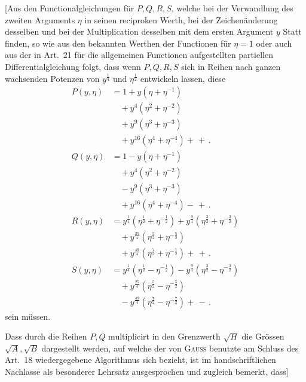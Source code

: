 [Aus den Functionalgleichungen für $P,\allowbreak Q,\allowbreak R,\allowbreak S$, welche bei der Verwandlung des zweiten Arguments $\eta$ in seinen reciproken Werth, bei der Zeichenänderung desselben und bei der Multiplication desselben mit dem ersten Argument $y$ Statt finden, so wie aus den bekannten Werthen der Functionen für $\eta=1$ oder auch aus der in Art.~21 für die allgemeinen Functionen aufgestellten partiellen Differentialgleichung folgt, dass wenn $P,\allowbreak Q,\allowbreak R,\allowbreak S$ sich in Reihen nach ganzen wachsenden Potenzen von $y^{\frac14}$ und $\eta^{\frac12}$ entwickeln lassen, diese
\[
\begin{aligned}
P(y,\eta)&=1+y(\eta+\eta^{-1})\\[4pt]&\quad{}+y^4(\eta^2+\eta^{-2})\\[4pt]&\quad{}+y^9(\eta^3+\eta^{-3})\\[4pt]&\quad{}+y^{16}(\eta^4+\eta^{-4})+\,+\,.\\[10pt]
Q(y,\eta)&=1-y(\eta+\eta^{-1})\\[4pt]&\quad{}+y^4(\eta^2+\eta^{-2})\\[4pt]&\quad{}-y^9(\eta^3+\eta^{-3})\\[4pt]&\quad{}+y^{16}(\eta^4+\eta^{-4})-\,+\,.\\[10pt]
R(y,\eta)&=y^{\frac14}(\eta^{\frac12}+\eta^{-\frac12})+y^{\frac94}(\eta^{\frac32}+\eta^{-\frac32})\\[4pt]&\quad{}+y^{\frac{25}4}(\eta^{\frac52}+\eta^{-\frac52})\\[4pt]&\quad{}+y^{\frac{49}4}(\eta^{\frac72}+\eta^{-\frac72})+\,+\,.\\[10pt]
S(y,\eta)&=y^{\frac14}(\eta^{\frac12}-\eta^{-\frac12})-y^{\frac94}(\eta^{\frac32}-\eta^{-\frac32})\\[4pt]&\quad{}+y^{\frac{25}4}(\eta^{\frac52}-\eta^{-\frac52})\\[4pt]&\quad{}-y^{\frac{49}4}(\eta^{\frac72}-\eta^{-\frac72})+\,-\,.
\end{aligned}
\]
sein müssen.

Dass durch die Reihen $P,\allowbreak Q$ multiplicirt in den Grenzwerth $\surd  H$ die Grössen $\surd  A,\allowbreak \surd  B$ dargestellt werden, auf welche der von \textsc{Gauss} benutzte am Schluss des Art.~18 wiedergegebene Algorithmus sich bezieht, ist im handschriftlichen Nachlasse als besonderer Lehrsatz ausgesprochen und zugleich bemerkt, dass]
